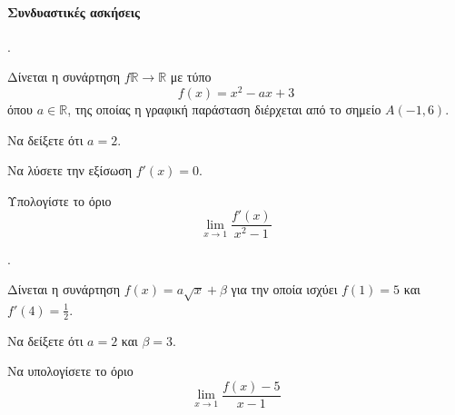 \documentclass[11pt,a4paper,twocolumn]{article}
\newcounter{askhsh}
\newcommand{\askhsh}{{\large\theaskhsh.}\ \addtocounter{askhsh}{1}}
\begin{document}
\paragraph{Συνδυαστικές ασκήσεις}
\askhsh Δίνεται η συνάρτηση $f\mathbb{R}\to\mathbb{R}$ με τύπο
\[ f(x)=x^2-ax+3 \]
όπου $a\in\mathbb{R}$, της οποίας η γραφική παράσταση διέρχεται από το σημείο $A(-1,6)$.
\begin{alist}
\item Να δείξετε ότι $a=2$.
\item Να λύσετε την εξίσωση $f'(x)=0$.
\item Υπολογίστε το όριο
\[\lim_{x\to1}{\frac{f'(x)}{x^2-1}}\]
\end{alist}
\askhsh Δίνεται η συνάρτηση $f(x)=a\sqrt{x}+\beta$ για την οποία ισχύει $f(1)=5$ και $f'(4)=\frac{1}{2}$.
\begin{alist}
\item Να δείξετε ότι $a=2$ και $\beta=3$.
\item Να υπολογίσετε το όριο
\[\lim_{x\to1}{\frac{f(x)-5}{x-1}}\]
\end{alist}
\end{document}
